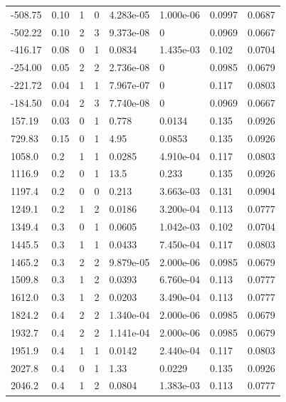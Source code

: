 \documentclass[preview]{standalone}
\begin{document}
{{\begin{tabular}{L{1.2cm}C{1.2cm} C{0.3cm}C{0.5cm} C{1.4cm}C{1.4cm} C{1.4cm}C{1.4cm}}
  -508.75  &  0.10  & 1     &  0 &  4.283e-05  & 1.000e-06  & 0.0997 &  0.0687   \\ 
  -502.22  &  0.10  & 2     &  3 &  9.373e-08  & 0  & 0.0969 &  0.0667   \\ 
  -416.17  &  0.08  & 0     &  1 &  0.0834  & 1.435e-03  & 0.102 &  0.0704   \\ 
  -254.00  &  0.05  & 2     &  2 &  2.736e-08  & 0  & 0.0985 &  0.0679   \\ 
  -221.72  &  0.04  & 1     &  1 &  7.967e-07  & 0  & 0.117 &  0.0803   \\ 
  -184.50  &  0.04  & 2     &  3 &  7.740e-08  & 0  & 0.0969 &  0.0667   \\ 
  157.19  &  0.03  & 0     &  1 &  0.778  & 0.0134  & 0.135 &  0.0926   \\ 
  729.83  &  0.15  & 0     &  1 &  4.95  & 0.0853  & 0.135 &  0.0926   \\ 
  1058.0  &   0.2  & 1     &  1 &  0.0285  & 4.910e-04  & 0.117 &  0.0803   \\ 
  1116.9  &   0.2  & 0     &  1 &  13.5  & 0.233  & 0.135 &  0.0926   \\ 
  1197.4  &   0.2  & 0     &  0 &  0.213  & 3.663e-03  & 0.131 &  0.0904   \\ 
  1249.1  &   0.2  & 1     &  2 &  0.0186  & 3.200e-04  & 0.113 &  0.0777   \\ 
  1349.4  &   0.3  & 0     &  1 &  0.0605  & 1.042e-03  & 0.102 &  0.0704   \\ 
  1445.5  &   0.3  & 1     &  1 &  0.0433  & 7.450e-04  & 0.117 &  0.0803   \\ 
  1465.2  &   0.3  & 2     &  2 &  9.879e-05  & 2.000e-06  & 0.0985 &  0.0679   \\ 
  1509.8  &   0.3  & 1     &  2 &  0.0393  & 6.760e-04  & 0.113 &  0.0777   \\ 
  1612.0  &   0.3  & 1     &  2 &  0.0203  & 3.490e-04  & 0.113 &  0.0777   \\ 
  1824.2  &   0.4  & 2     &  2 &  1.340e-04  & 2.000e-06  & 0.0985 &  0.0679   \\ 
  1932.7  &   0.4  & 2     &  2 &  1.141e-04  & 2.000e-06  & 0.0985 &  0.0679   \\ 
  1951.9  &   0.4  & 1     &  1 &  0.0142  & 2.440e-04  & 0.117 &  0.0803   \\ 
  2027.8  &   0.4  & 0     &  1 &  1.33  & 0.0229  & 0.135 &  0.0926   \\ 
  2046.2  &   0.4  & 1     &  2 &  0.0804  & 1.383e-03  & 0.113 &  0.0777   \\ 

\end{tabular}}}
\end{document}
